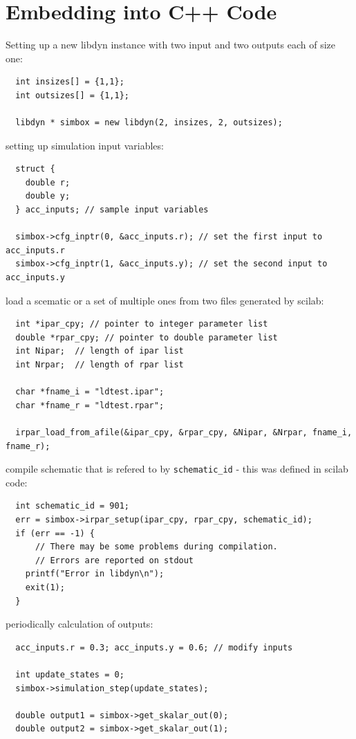 \documentclass[%
	pdftex,%
	a4paper,%
	oneside,%
	11pt,%
	halfparskip,%
	headsepline,%
	bibtotocnumbered,%
	idxtotoc%
]{scrartcl}
\begin{document}
\section{Embedding into C++ Code}
\label{sec:embeding}

Setting up a new libdyn instance with two input and two outputs each of size one:

\begin{verbatim}  
  int insizes[] = {1,1};
  int outsizes[] = {1,1};
 
  libdyn * simbox = new libdyn(2, insizes, 2, outsizes);
\end{verbatim}


setting up simulation input variables:

\begin{verbatim}
  struct {
    double r;
    double y;
  } acc_inputs; // sample input variables
  
  simbox->cfg_inptr(0, &acc_inputs.r); // set the first input to acc_inputs.r
  simbox->cfg_inptr(1, &acc_inputs.y); // set the second input to acc_inputs.y
\end{verbatim}

load a scematic or a set of multiple ones from two files generated by scilab:

\begin{verbatim}
  int *ipar_cpy; // pointer to integer parameter list
  double *rpar_cpy; // pointer to double parameter list
  int Nipar;  // length of ipar list
  int Nrpar;  // length of rpar list
    
  char *fname_i = "ldtest.ipar";
  char *fname_r = "ldtest.rpar";
  
  irpar_load_from_afile(&ipar_cpy, &rpar_cpy, &Nipar, &Nrpar, fname_i, fname_r); 
\end{verbatim}

compile schematic that is refered to by \texttt{schematic\_id} - this was defined in scilab code:

\begin{verbatim}
  int schematic_id = 901;
  err = simbox->irpar_setup(ipar_cpy, rpar_cpy, schematic_id);
  if (err == -1) { 
      // There may be some problems during compilation. 
      // Errors are reported on stdout
    printf("Error in libdyn\n");
    exit(1);
  }
\end{verbatim}

periodically calculation of outputs:

\begin{verbatim}
  acc_inputs.r = 0.3; acc_inputs.y = 0.6; // modify inputs

  int update_states = 0;
  simbox->simulation_step(update_states);

  double output1 = simbox->get_skalar_out(0);
  double output2 = simbox->get_skalar_out(1);  
\end{verbatim}
\end{document}
